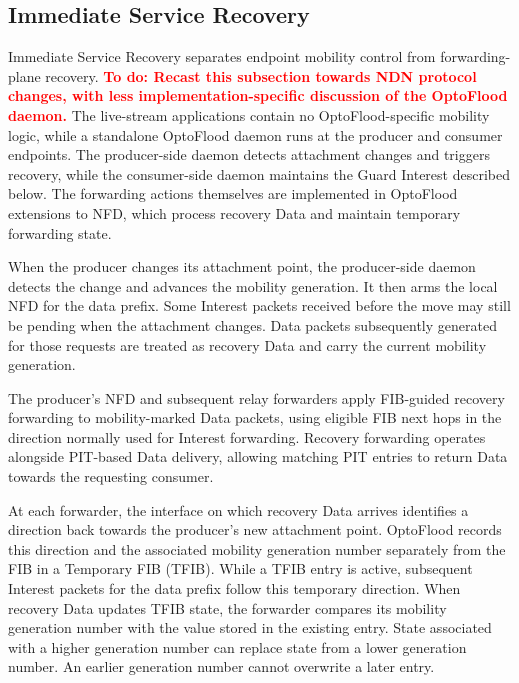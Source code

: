 \documentclass[10pt,conference]{IEEEtran}
\newcommand{\todo}[1]{\textbf{\textcolor{red}{To do: #1}}}
\begin{document}

\subsection{Immediate Service Recovery}
\label{sec:design:isr}

Immediate Service Recovery separates endpoint mobility control from forwarding-plane recovery. \todo{Recast this subsection towards NDN protocol changes, with less implementation-specific discussion of the OptoFlood daemon.} The live-stream applications contain no OptoFlood-specific mobility logic, while a standalone OptoFlood daemon runs at the producer and consumer endpoints. The producer-side daemon detects attachment changes and triggers recovery, while the consumer-side daemon maintains the Guard Interest described below. The forwarding actions themselves are implemented in OptoFlood extensions to NFD, which process recovery Data and maintain temporary forwarding state.

When the producer changes its attachment point, the producer-side daemon detects the change and advances the mobility generation. It then arms the local NFD for the data prefix. Some Interest packets received before the move may still be pending when the attachment changes. Data packets subsequently generated for those requests are treated as recovery Data and carry the current mobility generation.

The producer's NFD and subsequent relay forwarders apply FIB-guided recovery forwarding to mobility-marked Data packets, using eligible FIB next hops in the direction normally used for Interest forwarding. Recovery forwarding operates alongside PIT-based Data delivery, allowing matching PIT entries to return Data towards the requesting consumer.

At each forwarder, the interface on which recovery Data arrives identifies a direction back towards the producer's new attachment point. OptoFlood records this direction and the associated mobility generation number separately from the FIB in a Temporary FIB (TFIB). While a TFIB entry is active, subsequent Interest packets for the data prefix follow this temporary direction. When recovery Data updates TFIB state, the forwarder compares its mobility generation number with the value stored in the existing entry. State associated with a higher generation number can replace state from a lower generation number. An earlier generation number cannot overwrite a later entry.
\end{document}
